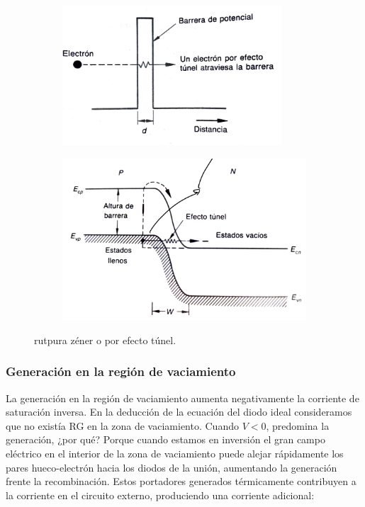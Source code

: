 \begin{figure}[h!]
    \centering
    \begin{subfigure}{0.47\textwidth}
        \includegraphics[width=0.9\textwidth]{Cuerpo/Ch_03/03_Temario_09.png}
    \end{subfigure}
    \begin{subfigure}{0.47\textwidth}
        \includegraphics[width=\textwidth]{Cuerpo/Ch_03/03_Temario_08.png}
    \end{subfigure}
    \caption{rutpura zéner o por efecto túnel.}
\end{figure}

\subsubsection{Generación en la región de vaciamiento}


La generación en la región de vaciamiento aumenta negativamente la corriente de saturación inversa. En la deducción de la ecuación del diodo ideal consideramos que no existía RG en la zona de vaciamiento. Cuando $V<0$, predomina la generación, ¿por qué? Porque cuando estamos en inversión el gran campo eléctrico en el interior de la zona de vaciamiento puede alejar rápidamente los pares hueco-electrón hacia los diodos de la unión, aumentando la generación frente la recombinación. Estos portadores generados térmicamente contribuyen a la corriente en el circuito externo, produciendo una corriente adicional: 

